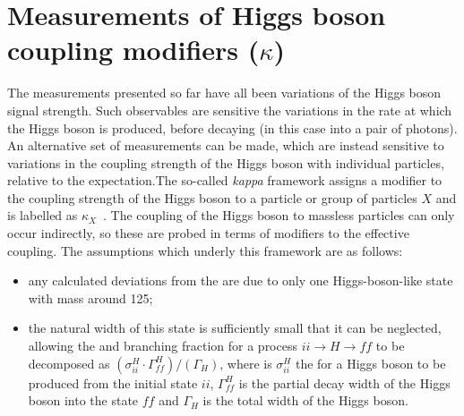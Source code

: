 \section{Measurements of Higgs boson coupling modifiers ($\kappa$)}

The measurements presented so far have all been variations of the Higgs boson signal strength. Such observables are sensitive the variations in the rate at which the Higgs boson is produced, before decaying (in this case into a pair of photons). An alternative set of measurements can be made, which are instead sensitive to variations in the coupling strength  of the Higgs boson with individual particles, relative to the \SM expectation.The so-called \emph{kappa} framework assigns a modifier to the coupling strength of the Higgs boson to a particle or group of particles $X$ and is labelled as $\kappa_{X}$~\cite{}. The coupling of the Higgs boson to massless particles can only occur indirectly, so these are probed in terms of modifiers to the effective coupling. 
The assumptions which underly this framework are as follows: 
\begin{itemize}
\item any calculated deviations from the \SM are due to only one Higgs-boson-like state with mass around 125\GeV;
\item the natural width of this state is sufficiently small that it can be neglected, allowing the \crosssection and branching fraction for a process $ii\rightarrow H \rightarrow ff$ to be decomposed as $(\sigma_{ii}^{H} \cdot \Gamma_{ff}^{H}) / (\Gamma_H)$, where is $\sigma_{ii}^{H}$ the \crosssection for a Higgs boson to be produced from the initial state $ii$,  $\Gamma^{H}_{ff}$ is the partial decay width of the Higgs boson into the state $ff$ and $\Gamma_{H}$ is the total width of the Higgs boson.
\end{itemize}


